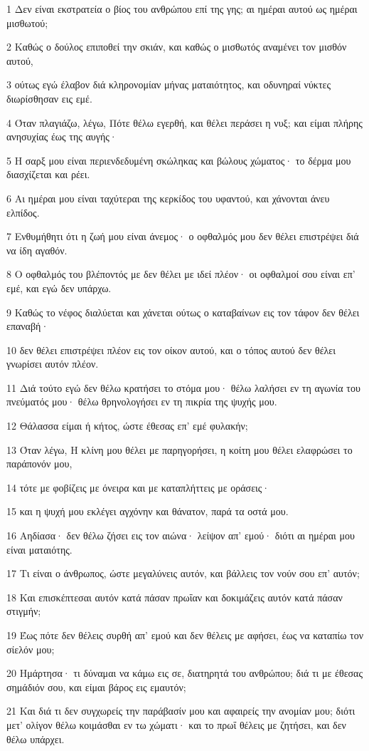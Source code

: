\par 1 Δεν είναι εκστρατεία ο βίος του ανθρώπου επί της γης; αι ημέραι αυτού ως ημέραι μισθωτού;
\par 2 Καθώς ο δούλος επιποθεί την σκιάν, και καθώς ο μισθωτός αναμένει τον μισθόν αυτού,
\par 3 ούτως εγώ έλαβον διά κληρονομίαν μήνας ματαιότητος, και οδυνηραί νύκτες διωρίσθησαν εις εμέ.
\par 4 Όταν πλαγιάζω, λέγω, Πότε θέλω εγερθή, και θέλει περάσει η νυξ; και είμαι πλήρης ανησυχίας έως της αυγής·
\par 5 Η σαρξ μου είναι περιενδεδυμένη σκώληκας και βώλους χώματος· το δέρμα μου διασχίζεται και ρέει.
\par 6 Αι ημέραι μου είναι ταχύτεραι της κερκίδος του υφαντού, και χάνονται άνευ ελπίδος.
\par 7 Ενθυμήθητι ότι η ζωή μου είναι άνεμος· ο οφθαλμός μου δεν θέλει επιστρέψει διά να ίδη αγαθόν.
\par 8 Ο οφθαλμός του βλέποντός με δεν θέλει με ιδεί πλέον· οι οφθαλμοί σου είναι επ' εμέ, και εγώ δεν υπάρχω.
\par 9 Καθώς το νέφος διαλύεται και χάνεται ούτως ο καταβαίνων εις τον τάφον δεν θέλει επαναβή·
\par 10 δεν θέλει επιστρέψει πλέον εις τον οίκον αυτού, και ο τόπος αυτού δεν θέλει γνωρίσει αυτόν πλέον.
\par 11 Διά τούτο εγώ δεν θέλω κρατήσει το στόμα μου· θέλω λαλήσει εν τη αγωνία του πνεύματός μου· θέλω θρηνολογήσει εν τη πικρία της ψυχής μου.
\par 12 Θάλασσα είμαι ή κήτος, ώστε έθεσας επ' εμέ φυλακήν;
\par 13 Όταν λέγω, Η κλίνη μου θέλει με παρηγορήσει, η κοίτη μου θέλει ελαφρώσει το παράπονόν μου,
\par 14 τότε με φοβίζεις με όνειρα και με καταπλήττεις με οράσεις·
\par 15 και η ψυχή μου εκλέγει αγχόνην και θάνατον, παρά τα οστά μου.
\par 16 Αηδίασα· δεν θέλω ζήσει εις τον αιώνα· λείψον απ' εμού· διότι αι ημέραι μου είναι ματαιότης.
\par 17 Τι είναι ο άνθρωπος, ώστε μεγαλύνεις αυτόν, και βάλλεις τον νούν σου επ' αυτόν;
\par 18 Και επισκέπτεσαι αυτόν κατά πάσαν πρωΐαν και δοκιμάζεις αυτόν κατά πάσαν στιγμήν;
\par 19 Έως πότε δεν θέλεις συρθή απ' εμού και δεν θέλεις με αφήσει, έως να καταπίω τον σίελόν μου;
\par 20 Ημάρτησα· τι δύναμαι να κάμω εις σε, διατηρητά του ανθρώπου; διά τι με έθεσας σημάδιόν σου, και είμαι βάρος εις εμαυτόν;
\par 21 Και διά τι δεν συγχωρείς την παράβασίν μου και αφαιρείς την ανομίαν μου; διότι μετ' ολίγον θέλω κοιμάσθαι εν τω χώματι· και το πρωΐ θέλεις με ζητήσει, και δεν θέλω υπάρχει.

